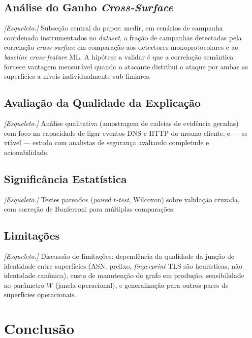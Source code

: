 \documentclass[preprint,12pt]{elsarticle}
\begin{document}
\subsection{Análise do Ganho \emph{Cross-Surface}}

\textit{[Esqueleto.]} Subseção central do paper: medir, em cenários de campanha coordenada instrumentados no \emph{dataset}, a fração de campanhas detectadas pela correlação \emph{cross-surface} em comparação aos detectores monoprotocolares e ao \emph{baseline} \emph{cross-feature} ML. A hipótese a validar é que a correlação semântica fornece vantagem mensurável quando o atacante distribui o ataque por ambas as superfícies a níveis individualmente sub-limiares.

\subsection{Avaliação da Qualidade da Explicação}

\textit{[Esqueleto.]} Análise qualitativa (amostragem de cadeias de evidência geradas) com foco na capacidade de ligar eventos DNS e HTTP do mesmo cliente, e --- se viável --- estudo com analistas de segurança avaliando completude e acionabilidade.

\subsection{Significância Estatística}

\textit{[Esqueleto.]} Testes pareados (\emph{paired $t$-test}, Wilcoxon) sobre validação cruzada, com correção de Bonferroni para múltiplas comparações.

\subsection{Limitações}

\textit{[Esqueleto.]} Discussão de limitações: dependência da qualidade da junção de identidade entre superfícies (ASN, prefixo, \emph{fingerprint} TLS são heurísticas, não identidade canônica), custo de manutenção do grafo em produção, sensibilidade ao parâmetro $W$ (janela operacional), e generalização para outros pares de superfícies operacionais.


\section{Conclusão}
\label{sec:conclusion}
\end{document}
